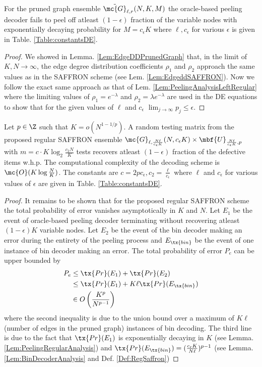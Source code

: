 \documentclass[conference,twocolumn]{IEEEtran}
\def\ceps{c_{\epsilon}}
\begin{document}
\begin{lemma}
\label{Lem:PeelingRegularAnalysis}
For the pruned graph ensemble $\tilde{\mc{G}}_{\ell,r}(N, K,M)$ the oracle-based peeling decoder fails to peel off atleast $(1-\epsilon)$ fraction of the variable nodes with exponentially decaying probability for $M=\ceps K$ where $\ell, \ceps$ for various $\epsilon$ is given in Table. \ref{Table:constantsDE}.
\end{lemma}
\begin{proof}
We showed in Lemma. \ref{Lem:EdgeDDPrunedGraph} that, in the limit of $K,N\rightarrow\infty$, the edge degree distribution coefficients $\rho_1$ and $\rho_2$ approach the same values as in the SAFFRON scheme (see Lem. \ref{Lem:EdgeddSAFFRON}). Now we follow the exact same approach as that of Lem. \ref{Lem:PeelingAnalysisLeftRegular} where the limiting values of $\rho_1=e^{-\lambda}$ and $\rho_2=\lambda e^{-\lambda}$ are used in the DE equations to show that for the given values of $\ell$ and $\ceps$ $\lim_{j\rightarrow\infty}p_j \leq \epsilon$. 
\end{proof}

\begin{theorem}
\label{Thm:NoiselessMain}
Let $p\in\Z$ such that $K=o(N^{1-1/p})$. A random testing matrix from the proposed regular SAFFRON ensemble $\mc{G}_{\ell,\frac{N\ell}{\ceps K}}(N,\ceps K)\times \mbf{U}_{\frac{N\ell}{\ceps K},p}$ with $m=c\cdot K\log_{2}\frac{c_2 N}{K}$ tests recovers atleast $(1-\epsilon)$ fraction of the defective items w.h.p. The computational complexity of the decoding scheme is $\mc{O}(K\log \frac{N}{K})$. The constants are $c=2p\ceps, c_2=\frac{\ell}{\ceps}$ where $\ell$ and $\ceps$ for various values of $\epsilon$ are given in Table. \ref{Table:constantsDE}.
\end{theorem}
\begin{proof}
It remains to be shown that for the proposed regular SAFFRON scheme the total probability of error vanishes asymptotically in $K$ and $N$. Let $E_1$ be the event of oracle-based peeling decoder terminating without recovering atleast $(1-\epsilon)K$ variable nodes. Let $E_2$ be the event of the bin decoder making an error during the entirety of the peeling process and $E_{\tx{bin}}$ be the event of one instance of bin decoder making an error. The total probability of error $P_e$ can be upper bounded by
\begin{align*}
P_e &\leq \tx{Pr}(E_1)+ \tx{Pr}(E_2)\\
               &\leq \tx{Pr}(E_1)+ K\ell\tx{ Pr}(E_{\tx{bin}})\\
               &\in O\left(\frac{K^{p}}{N^{p-1}}\right)
\end{align*}
where the second inequality is due to the union bound over a maximum of $K\ell$ (number of edges in the pruned graph) instances of bin decoding. The third line is due to the fact that $\tx{Pr}(E_1)$ is exponentially decaying in $K$ (see Lemma. \ref{Lem:PeelingRegularAnalysis}) and $\tx{Pr}(E_{\tx{bin}})=(\frac{\ceps K}{N\ell})^{p-1}$ (see Lemma. \ref{Lem:BinDecoderAnalysis} and Def. \ref{Def:RegSaffron})
\end{proof}
\end{document}
